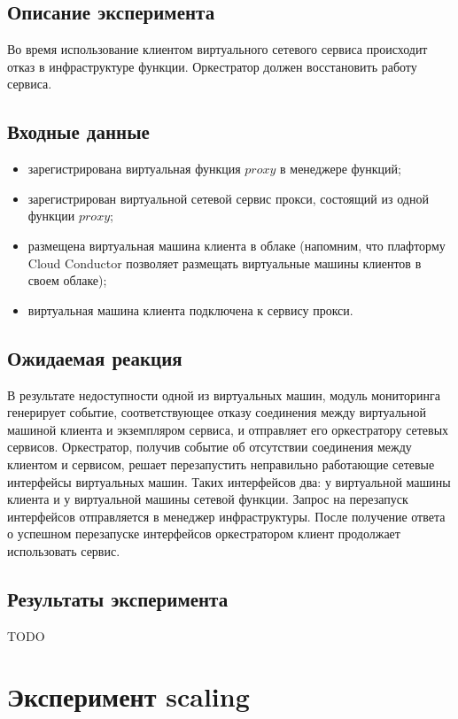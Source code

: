 \documentclass[oneside,final,14pt,a4paper]{extreport}
\begin{document}
\subsection{Описание эксперимента}
Во время использование клиентом виртуального сетевого сервиса происходит отказ в инфраструктуре функции. Оркестратор должен восстановить работу сервиса.

\subsection{Входные данные}
\begin{itemize}
	\item зарегистрирована виртуальная функция $proxy$ в менеджере функций;
	\item зарегистрирован виртуальной сетевой сервис прокси, состоящий из одной функции $proxy$;
	\item размещена виртуальная машина клиента в облаке (напомним, что плафторму Cloud Conductor позволяет размещать виртуальные машины клиентов в своем облаке);
	\item виртуальная машина клиента подключена к сервису прокси.
\end{itemize}

\subsection{Ожидаемая реакция}
В результате недоступности одной из виртуальных машин, модуль мониторинга генерирует событие, соответствующее отказу соединения между виртуальной машиной клиента и экземпляром сервиса, и отправляет его оркестратору сетевых сервисов. Оркестратор, получив событие об отсутствии соединения между клиентом и сервисом, решает перезапустить неправильно работающие сетевые интерфейсы виртуальных машин. Таких интерфейсов два: у виртуальной машины клиента и у виртуальной машины сетевой функции. Запрос на перезапуск интерфейсов отправляется в менеджер инфраструктуры. После получение ответа о успешном перезапуске интерфейсов оркестратором клиент продолжает использовать сервис.

\subsection{Результаты эксперимента}
TODO

\section{Эксперимент scaling}
\end{document}
